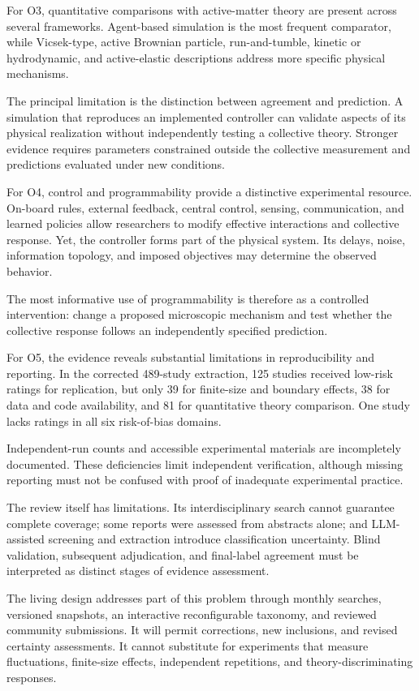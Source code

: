 For O3, quantitative comparisons with
active-matter theory are present across
several frameworks. Agent-based simulation
is the most frequent comparator, while
Vicsek-type, active Brownian particle,
run-and-tumble, kinetic or hydrodynamic,
and active-elastic descriptions address
more specific physical mechanisms.

The principal limitation is the distinction
between agreement and prediction. A
simulation that reproduces an implemented
controller can validate aspects of its
physical realization without independently
testing a collective theory. Stronger
evidence requires parameters constrained
outside the collective measurement and
predictions evaluated under new conditions.

For O4, control and programmability provide
a distinctive experimental resource.
On-board rules, external feedback,
central control, sensing, communication,
and learned policies allow researchers
to modify effective interactions and
collective response. Yet, the controller
forms part of the physical system.
Its delays, noise, information topology,
and imposed objectives may determine
the observed behavior.

The most informative use of programmability
is therefore as a controlled intervention:
change a proposed microscopic mechanism
and test whether the collective response
follows an independently specified prediction.

For O5, the evidence reveals substantial
limitations in reproducibility and
reporting. In the corrected 489-study
extraction, 125 studies received low-risk
ratings for replication, but only 39
for finite-size and boundary effects,
38 for data and code availability,
and 81 for quantitative theory comparison.
One study lacks ratings in all six
risk-of-bias domains.

Independent-run counts and accessible
experimental materials are incompletely
documented. These deficiencies limit
independent verification, although
missing reporting must not be confused
with proof of inadequate experimental
practice.

The review itself has limitations.
Its interdisciplinary search cannot
guarantee complete coverage;
some reports were assessed from
abstracts alone; and LLM-assisted
screening and extraction introduce
classification uncertainty. Blind
validation, subsequent adjudication,
and final-label agreement must be
interpreted as distinct stages
of evidence assessment.

The living design addresses part of
this problem through monthly searches,
versioned snapshots, an interactive
reconfigurable taxonomy, and reviewed
community submissions. It will permit
corrections, new inclusions, and revised
certainty assessments. It cannot
substitute for experiments that
measure fluctuations, finite-size
effects, independent repetitions,
and theory-discriminating responses.

